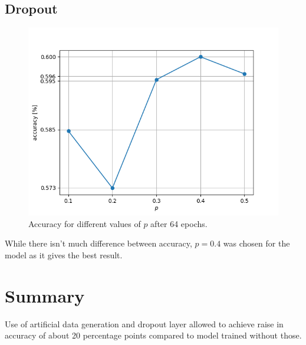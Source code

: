 		\subsection{Dropout}
			\begin{figure}[h!]
				\centering				
				\caption{Accuracy for different values of $p$ after 64 epochs.}
				\includegraphics[width = \textwidth]{img/dropout}	
			\end{figure}
			While there isn't much difference between accuracy, $p = 0.4$ was chosen for the model as it gives the best result. 				
	\section{Summary}
		Use of artificial data generation and dropout layer allowed to achieve raise in accuracy of about 20 percentage points compared to model trained without those.
